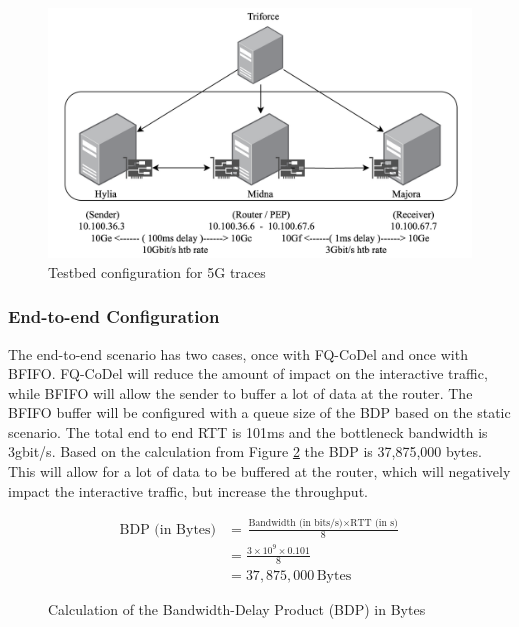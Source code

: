 \documentclass[a4paper,english, 12pt]{report}
\begin{document}
\begin{figure}[!h!] %
	\centering
	\includegraphics[scale=0.60]{../diagrams/drawio/testbed2.png}
  	\caption{Testbed configuration for 5G traces}
  	\label{fig:testbed2}
\end{figure}

\subsubsection{End-to-end Configuration}
The end-to-end scenario has two cases, once with FQ-CoDel and once with BFIFO. FQ-CoDel will reduce the amount of impact on the interactive traffic, while BFIFO will allow the sender to buffer a lot of data at the router. The BFIFO buffer will be configured with a queue size of the BDP based on the static scenario. The total end to end RTT is 101ms and the bottleneck bandwidth is 3gbit/s. Based on the calculation from Figure \ref{eq:bdp_calculation} the BDP is 37,875,000 bytes. This will allow for a lot of data to be buffered at the router, which will negatively impact the interactive traffic, but increase the throughput.\\

\begin{figure}[ht]
\centering
\begin{equation}
\begin{aligned}
\text{BDP (in Bytes)} &= \frac{\text{Bandwidth (in bits/s)} \times \text{RTT (in s)}}{8} \\
&= \frac{3 \times 10^9 \times 0.101}{8} \\
&= 37,875,000 \, \text{Bytes}
\end{aligned}
\end{equation}
\caption{Calculation of the Bandwidth-Delay Product (BDP) in Bytes}
\label{eq:bdp_calculation}
\end{figure}
\end{document}
